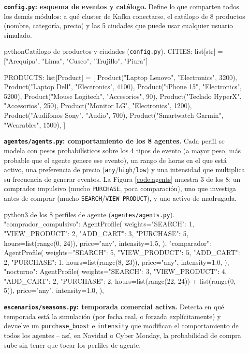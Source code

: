 \textbf{\texttt{config.py}: esquema de eventos y catálogo.} Define lo que comparten todos los demás módulos: a qué cluster de Kafka conectarse, el catálogo de 8 productos (nombre, categoría, precio) y las 5 ciudades que puede usar cualquier usuario simulado.

\begin{sourcecode}[\label{code:config}]{python}{Catálogo de productos y ciudades (\texttt{config.py}).}
CITIES: list[str] = ["Arequipa", "Lima", "Cusco", "Trujillo", "Piura"]

PRODUCTS: list[Product] = [
    Product("Laptop Lenovo", "Electronics", 3200),
    Product("Laptop Dell", "Electronics", 4100),
    Product("iPhone 15", "Electronics", 5200),
    Product("Mouse Logitech", "Accesorios", 90),
    Product("Teclado HyperX", "Accesorios", 250),
    Product("Monitor LG", "Electronics", 1200),
    Product("Audifonos Sony", "Audio", 700),
    Product("Smartwatch Garmin", "Wearables", 1500),
]
\end{sourcecode}

\textbf{\texttt{agentes/agents.py}: comportamiento de los 8 agentes.} Cada perfil se modela con pesos probabilísticos sobre los 4 tipos de evento (a mayor peso, más probable que el agente genere ese evento), un rango de horas en el que está activo, una preferencia de precio (\texttt{any}/\texttt{high}/\texttt{low}) y una intensidad que multiplica su frecuencia de generar eventos. La Figura \ref{code:agents} muestra 3 de los 8: un comprador impulsivo (mucho \texttt{PURCHASE}, poca comparación), uno que investiga antes de comprar (mucho \texttt{SEARCH}/\texttt{VIEW\_PRODUCT}), y uno activo de madrugada.

\begin{sourcecode}[\label{code:agents}]{python}{3 de los 8 perfiles de agente (\texttt{agentes/agents.py}).}
"comprador_compulsivo": AgentProfile(
    weights={"SEARCH": 1, "VIEW_PRODUCT": 2, "ADD_CART": 3, "PURCHASE": 5},
    hours=list(range(0, 24)), price="any", intensity=1.5,
),
"comparador": AgentProfile(
    weights={"SEARCH": 5, "VIEW_PRODUCT": 5, "ADD_CART": 2, "PURCHASE": 1},
    hours=list(range(8, 23)), price="any", intensity=1.0,
),
"nocturno": AgentProfile(
    weights={"SEARCH": 3, "VIEW_PRODUCT": 4, "ADD_CART": 2, "PURCHASE": 2},
    hours=list(range(22, 24)) + list(range(0, 5)), price="any", intensity=1.0,
),
\end{sourcecode}

\textbf{\texttt{escenarios/seasons.py}: temporada comercial activa.} Detecta en qué temporada está la simulación (por fecha real, o forzada explícitamente) y devuelve un \texttt{purchase\_boost} e \texttt{intensity} que modifican el comportamiento de todos los agentes -- así, en Navidad o Cyber Monday, la probabilidad de compra sube sin tener que tocar los perfiles de agente.

